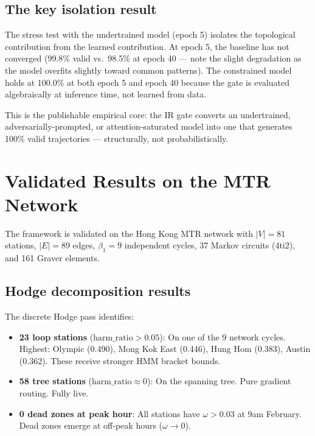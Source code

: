 \documentclass[11pt,a4paper]{article}
\begin{document}
\subsection{The key isolation result}

The stress test with the undertrained model (epoch 5) isolates
the topological contribution from the learned contribution.
At epoch 5, the baseline has not converged (99.8\% valid vs.\ 98.5\%
at epoch 40 — note the slight degradation as the model overfits
slightly toward common patterns).
The constrained model holds at 100.0\% at both epoch 5 and epoch 40
because the gate is evaluated algebraically at inference time,
not learned from data.

This is the publishable empirical core: the IR gate converts an
undertrained, adversarially-prompted, or attention-saturated model
into one that generates 100\% valid trajectories --- structurally,
not probabilistically.

\section{Validated Results on the MTR Network}

The framework is validated on the Hong Kong MTR network with
$|V| = 81$ stations, $|E| = 89$ edges, $\beta_1 = 9$ independent
cycles, 37 Markov circuits (4ti2), and 161 Graver elements.

\subsection{Hodge decomposition results}

The discrete Hodge pass identifies:
\begin{itemize}
  \item \textbf{23 loop stations} ($\mathrm{harm\_ratio} > 0.05$):
        On one of the 9 network cycles. Highest: Olympic (0.490),
        Mong Kok East (0.446), Hung Hom (0.383), Austin (0.362).
        These receive stronger HMM bracket bounds.
  \item \textbf{58 tree stations} ($\mathrm{harm\_ratio} \approx 0$):
        On the spanning tree. Pure gradient routing. Fully live.
  \item \textbf{0 dead zones at peak hour}: All stations have
        $\omega > 0.03$ at 9am February. Dead zones emerge
        at off-peak hours ($\omega \to 0$).
\end{itemize}
\end{document}
